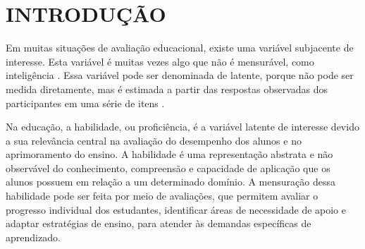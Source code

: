 \chapter{INTRODUÇÃO}

Em muitas situações de avaliação educacional, existe uma variável subjacente de interesse. Esta variável é muitas vezes algo que não é mensurável, como inteligência \cite{baker2001}. Essa variável pode ser denominada de latente, porque não pode ser medida diretamente, mas é estimada a partir das respostas observadas dos participantes em uma série de itens \cite{pasquali2003}. 


Na educação, a habilidade, ou proficiência, é a variável latente de interesse devido a sua relevância central na avaliação do desempenho dos alunos e no aprimoramento do ensino. A habilidade é uma representação abstrata e não observável do conhecimento, compreensão e capacidade de aplicação que os alunos possuem em relação a um determinado domínio. A mensuração dessa habilidade pode ser feita por meio de avaliações, que permitem avaliar o progresso individual dos estudantes, identificar áreas de necessidade de apoio e adaptar estratégias de ensino, para atender às demandas específicas de aprendizado.
\begin{comment}
	A avaliação desempenha um papel de extrema importância no contexto educacional, conforme enfatizado por Gimeno (1994) ao afirmar que ``a função fundamental que a avaliação deve cumprir no processo didático é a de informar ou conscientizar os professores acerca de como caminham os acontecimentos em sua turma, os processos de aprendizagem que desencadeiam em cada um de seus alunos, durante o mesmo.'' Essa citação destaca que a avaliação vai além de simplesmente medir resultados; ela serve como um meio essencial para os educadores compreenderem o desenvolvimento de suas turmas. Através da avaliação, os professores podem identificar as necessidades específicas de cada estudante, adaptar suas abordagens pedagógicas e fornecer suporte personalizado, criando um ambiente educacional que promove o crescimento tanto individual quanto coletivo.



A estimativa da habilidade em simulados do oferece aos estudantes uma compreensão precisa do seu nível de preparação e das áreas que requerem melhoria. Isso permite que os alunos identifiquem seus pontos fortes e fracos, direcionando seus esforços de estudo de forma mais eficaz. Além disso, a estimativa da habilidade ajuda os educadores e instituições a adaptar estratégias de ensino e programas de apoio com base nas necessidades reais dos estudantes, contribuindo para um ensino mais eficaz. Para a gestão educacional, a habilidade estimada em simulados pode fornecer informações valiosas sobre o desempenho dos alunos em nível nacional e regional, orientando políticas educacionais informadas e promovendo a melhoria contínua do sistema educacional. 

\end{comment}


